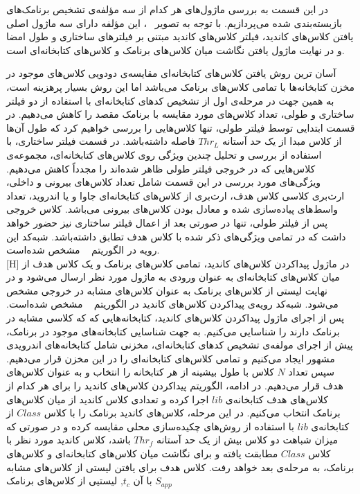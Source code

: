 در این قسمت به بررسی ماژول‌های هر کدام از سه مؤلفه‌ی تشخیص برنامک‌های بازبسته‌بندی شده می‌پردازیم.
با توجه به تصویر ~، این مؤلفه‌ دارای سه ماژول اصلی یافتن کلاس‌های کاندید، فیلتر کلاس‌های کاندید مبتنی بر فیلتر‌های ساختاری و طول امضا و در نهایت ماژول یافتن نگاشت میان کلاس‌های برنامک و کلاس‌های کتابخانه‌ای است.

آسان ‌ترین روش یافتن کلاس‌های کتابخانه‌ای مقایسه‌ی دودویی کلاس‌های موجود در مخزن کتابخانه‌ها با تمامی کلاس‌های برنامک می‌باشد اما این روش بسیار پرهزینه‌ است، به همین جهت در مرحله‌ی اول از تشخیص کد‌های کتابخانه‌ای با استفاده از دو فیلتر ساختاری و طولی، تعداد کلاس‌های مورد مقایسه با برنامک مقصد را کاهش می‌دهیم. در قسمت ابتدایی توسط فیلتر طولی، تنها کلاس‌هایی را بررسی خواهیم کرد که طول آن‌ها از کلاس مبدا از یک حد آستانه $Thr_L$ فاصله‌ داشته‌باشد. در قسمت فیلتر ساختاری، با استفاده از بررسی و تحلیل چندین ویژگی روی کلاس‌های کتابخانه‌ای، مجموعه‌ی کلاس‌هایی که در خروجی فیلتر طولی ظاهر شده‌اند را مجدداً کاهش می‌دهیم. ویژگی‌های مورد بررسی در این قسمت شامل تعداد کلاس‌های بیرونی و داخلی، ارث‌بری کلاسی کلاس هدف، ارث‌بری از کلاس‌های کتابخانه‌ای جاوا و یا اندروید، تعداد واسط‌های پیاده‌سازی شده و معادل بودن کلاس‌های بیرونی می‌باشد. کلاس خروجی پس از فیلتر طولی، تنها در صورتی بعد از اعمال فیلتر ساختاری نیز حضور خواهد داشت که در تمامی ویژگی‌های ذکر شده با کلاس هدف تطابق داشته‌باشد. شبه‌کد این رویه در الگوریتم ~ مشخص شده‌‌است. \\ 
[H]
\vspace{1em}
در ماژول پیداکردن کلاس‌های کاندید، تمامی کلاس‌های برنامک و یک کلاس هدف از میان کلاس‌های کتابخانه‌ای به عنوان ورودی به ماژول مورد نظر ارسال می‌شود و در نهایت لیستی از کلاس‌های برنامک به عنوان کلاس‌های مشابه در خروجی مشخص می‌شود. شبه‌کد رویه‌ی پیداکردن کلاس‌های کاندید در الگوریتم ~ مشخص شده‌است. پس از اجرای ماژول پیدا‌کردن کلاس‌های کاندید،‌ کتابخانه‌هایی که که کلاسی مشابه در برنامک‌ دارند را شناسایی می‌کنیم. به جهت شناسایی کتابخانه‌‌های موجود در برنامک، پیش از اجرای مولفه‌ی تشخیص کد‌های کتابخانه‌ای، مخزنی شامل کتابخانه‌های اندرویدی مشهور ایجاد می‌کنیم و تمامی کلاس‌های کتابخانه‌ای را در این مخزن قرار می‌دهیم. سپس تعداد $N$ کلاس با طول بیشینه از هر کتابخانه‌ را انتخاب و به عنوان کلاس‌های هدف قرار می‌دهیم. در ادامه، الگوریتم پیدا‌کردن کلاس‌های کاندید را برای هر کدام از کلاس‌های هدف کتابخانه‌ی $lib$ اجرا کرده و تعدادی کلاس کاندید از میان کلاس‌های برنامک انتخاب می‌کنیم. در این مرحله، کلاس‌های کاندید برنامک را با کلاس $Class$ از کتابخانه‌ی $lib$ با استفاده از روش‌های چکیده‌سازی محلی مقایسه کرده و در صورتی که میزان شباهت دو کلاس بیش از یک حد آستانه $Thr_f$ باشد، کلاس کاندید مورد نظر با کلاس $Class$ مطابقت یافته و برای نگاشت میان کلاس‌های کتابخانه‌ای و کلاس‌های برنامک، به مرحله‌ی بعد خواهد رفت.
 کلاس هدف برای یافتن لیستی از کلاس‌های مشابه با آن $t_c$, لیستیی از کلاس‌های برنامک $S_{app}$


